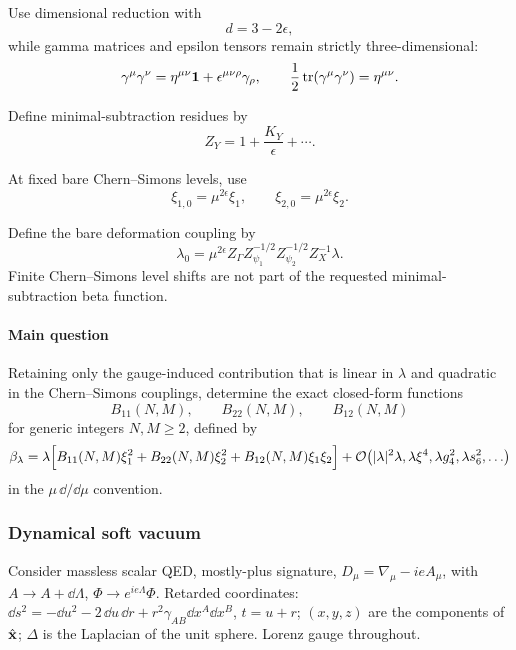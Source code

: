 Use dimensional reduction with
\begin{equation}
d=3-2\epsilon,
\end{equation}
while gamma matrices and epsilon tensors remain strictly three-dimensional:
\begin{equation}
\gamma^\mu\gamma^\nu
=\eta^{\mu\nu}\mathbf{1}+\epsilon^{\mu\nu\rho}\gamma_\rho,
\qquad
\frac12\operatorname{tr}(\gamma^\mu\gamma^\nu)=\eta^{\mu\nu}.
\end{equation}

Define minimal-subtraction residues by
\begin{equation}
Z_Y=1+\frac{K_Y}{\epsilon}+\cdots.
\end{equation}

At fixed bare Chern--Simons levels, use
\begin{equation}
\xi_{1,0}=\mu^{2\epsilon}\xi_1,
\qquad
\xi_{2,0}=\mu^{2\epsilon}\xi_2.
\end{equation}

Define the bare deformation coupling by
\begin{equation}
\lambda_0
=\mu^{2\epsilon}Z_\Gamma Z_{\psi_1}^{-1/2}Z_{\psi_2}^{-1/2}Z_X^{-1}\lambda.
\end{equation}
Finite Chern--Simons level shifts are not part of the requested minimal-subtraction beta function.

\paragraph*{Main question}

Retaining only the gauge-induced contribution that is linear in $\lambda$ and quadratic in the Chern--Simons couplings, determine the exact closed-form functions
\begin{equation}
B_{11}(N,M),
\qquad
B_{22}(N,M),
\qquad
B_{12}(N,M)
\end{equation}
for generic integers $N,M\geq2$, defined by
\begin{equation}
\beta_\lambda
=\lambda\Bigl[
B_{11}(N,M)\xi_1^2
+B_{22}(N,M)\xi_2^2
+B_{12}(N,M)\xi_1\xi_2
\Bigr]
+\mathcal O\!\left(
|\lambda|^2\lambda,\lambda\xi^4,\lambda g_4^2,\lambda s_6^2,\ldots
\right)
\end{equation}
in the $\mu\,\dd/\dd\mu$ convention.


\subsubsection{Dynamical soft vacuum}
\label{problem:dynamical-soft-vacuum}
Consider massless scalar QED, mostly-plus signature, $D_\mu=\nabla_\mu-ieA_\mu$, with $A\to A+\dd\Lambda$, $\Phi\to e^{ie\Lambda}\Phi$. Retarded coordinates: $\dd s^2=-\dd u^2-2\,\dd u\,\dd r+r^2\gamma_{AB}\dd x^A\dd x^B$, $t=u+r$; $(x,y,z)$ are the components of $\hat{\mathbf{x}}$; $\Delta$ is the Laplacian of the unit sphere. Lorenz gauge throughout.

